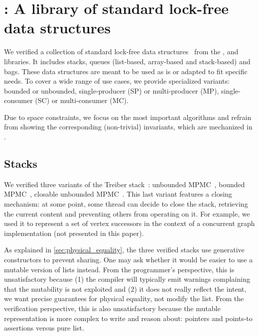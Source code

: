 \section{\Saturn: A library of standard lock-free data structures}
\label{sec:saturn}

We verified a collection of standard lock-free data structures~ from the \Saturn, \Eio and \Picos~\citep*{picos} libraries.
It includes stacks, queues (list-based, array-based and stack-based) and bags.
These data structures are meant to be used as is or adapted to fit specific needs.
To cover a wide range of use cases, we provide specialized variants: bounded or unbounded, single-producer (SP) or multi-producer (MP), single-consumer (SC) or multi-consumer (MC).

Due to space constraints, we focus on the most important algorithms and refrain from showing the corresponding (non-trivial) \Iris invariants, which are mechanized in \Rocq.

\subsection{Stacks}

We verified three variants of the Treiber stack~\citep*{thomas1986systems}: unbounded MPMC~, bounded MPMC~, closable unbounded MPMC~.
This last variant features a closing mechanism: at some point, some thread can decide to close the stack, retrieving the current content and preventing others from operating on it.
For example, we used it to represent a set of vertex successors in the context of a concurrent graph implementation (not presented in this paper).

As explained in \cref{sec:physical_equality}, the three verified stacks use generative constructors to prevent sharing.
One may ask whether it would be easier to use a mutable version of lists instead.
From the programmer's perspective, this is unsatisfactory because (1) the compiler will typically emit warnings complaining that the mutability is not exploited and (2) it does not really reflect the intent, \ie we want precise guarantees for physical equality, not modify the list.
From the verification perspective, this is also unsatisfactory because the mutable representation is more complex to write and reason about: pointers and points-to assertions versus pure \Rocq list.

